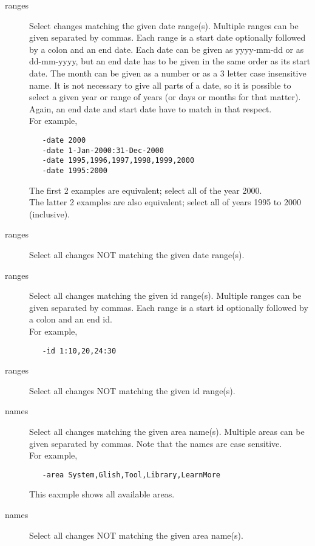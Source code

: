\begin{description}
\item[ ranges]
   Select changes matching the given date range(s). Multiple ranges can be
   given separated by commas. Each range is a start date optionally
   followed by a colon and an end date.
   Each date can be given as yyyy-mm-dd or as dd-mm-yyyy, but an 
   end date has to be given in the same order as its start date.
   The month can be given as a number or as a 3 letter case
   insensitive name.
   It is not necessary to give all parts of a date, so it is possible
   to select a given year or range of years (or days or months for
   that matter). Again, an end date and start date have to match
   in that respect.
   \\For example,
\begin{verbatim}
   -date 2000
   -date 1-Jan-2000:31-Dec-2000
   -date 1995,1996,1997,1998,1999,2000
   -date 1995:2000
\end{verbatim}
   The first 2 examples are equivalent; select all of the year 2000.
   \\The latter 2 examples are also equivalent; select all of years
   1995 to 2000 (inclusive).

\item[ ranges]
   Select all changes NOT matching the given date range(s).

\item[ ranges]
   Select all changes matching the given id range(s).
   Multiple ranges can be given separated by commas.
   Each range is a start id optionally followed by a colon and an end id.
   \\For example,
\begin{verbatim}
   -id 1:10,20,24:30
\end{verbatim}

\item[ ranges]
   Select all changes NOT matching the given id range(s).

\item[ names]
   Select all changes matching the given area name(s).
   Multiple areas can be given separated by commas.
   Note that the names are case sensitive.
   \\For example,
\begin{verbatim}
   -area System,Glish,Tool,Library,LearnMore
\end{verbatim}
   This eaxmple shows all available areas.

\item[ names]
   Select all changes NOT matching the given area name(s).


\end{description}
